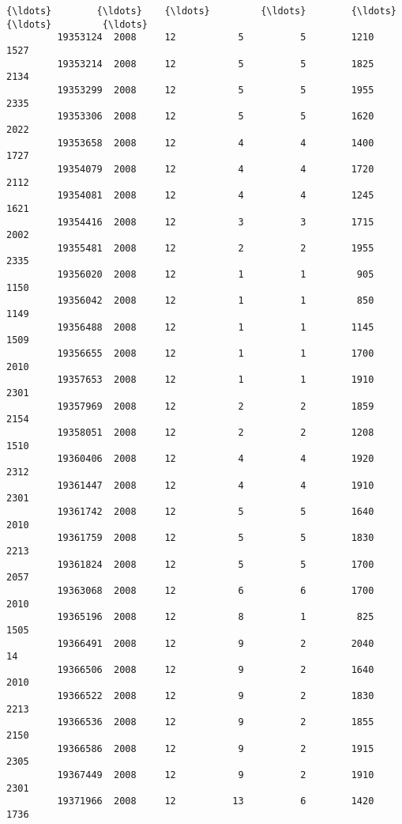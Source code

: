 \documentclass[11pt]{article}
\begin{document}
\begin{Verbatim}[commandchars=\\\{\}]
         {\ldots}        {\ldots}    {\ldots}         {\ldots}        {\ldots}         {\ldots}         {\ldots}   
         19353124  2008     12           5          5        1210        1527   
         19353214  2008     12           5          5        1825        2134   
         19353299  2008     12           5          5        1955        2335   
         19353306  2008     12           5          5        1620        2022   
         19353658  2008     12           4          4        1400        1727   
         19354079  2008     12           4          4        1720        2112   
         19354081  2008     12           4          4        1245        1621   
         19354416  2008     12           3          3        1715        2002   
         19355481  2008     12           2          2        1955        2335   
         19356020  2008     12           1          1         905        1150   
         19356042  2008     12           1          1         850        1149   
         19356488  2008     12           1          1        1145        1509   
         19356655  2008     12           1          1        1700        2010   
         19357653  2008     12           1          1        1910        2301   
         19357969  2008     12           2          2        1859        2154   
         19358051  2008     12           2          2        1208        1510   
         19360406  2008     12           4          4        1920        2312   
         19361447  2008     12           4          4        1910        2301   
         19361742  2008     12           5          5        1640        2010   
         19361759  2008     12           5          5        1830        2213   
         19361824  2008     12           5          5        1700        2057   
         19363068  2008     12           6          6        1700        2010   
         19365196  2008     12           8          1         825        1505   
         19366491  2008     12           9          2        2040          14   
         19366506  2008     12           9          2        1640        2010   
         19366522  2008     12           9          2        1830        2213   
         19366536  2008     12           9          2        1855        2150   
         19366586  2008     12           9          2        1915        2305   
         19367449  2008     12           9          2        1910        2301   
         19371966  2008     12          13          6        1420        1736   
         

\end{Verbatim}
\end{document}
